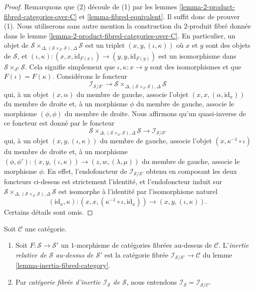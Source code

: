 \begin{proof}
Remarquons que (2) découle de (1) par les
lemmes \ref{lemma-2-product-fibred-categories-over-C} et
\ref{lemma-fibred-equivalent}. Il suffit donc de prouver (1).
Nous utiliserons sans autre mention la construction du $2$-produit fibré
donnée dans le
lemme \ref{lemma-2-product-fibred-categories-over-C}.
En particulier, un objet de
$\mathcal{S}
\times_{\Delta, (\mathcal{S} \times_{\mathcal{S}'} \mathcal{S}), \Delta}
\mathcal{S}$
est un triplet $(x, y, (\iota, \kappa))$ où $x$ et $y$ sont des objets de
$\mathcal{S}$, et
$(\iota, \kappa) : (x, x, \text{id}_{F(x)}) \to (y, y, \text{id}_{F(y)})$
est un isomorphisme dans $\mathcal{S} \times_{\mathcal{S}'} \mathcal{S}$.
Cela signifie simplement que $\iota, \kappa : x \to y$ sont des isomorphismes et que
$F(\iota) = F(\kappa)$. Considérons le foncteur
$$
\mathcal{I}_{\mathcal{S}/\mathcal{S}'}
\longrightarrow
\mathcal{S}
\times_{\Delta, (\mathcal{S} \times_{\mathcal{S}'} \mathcal{S}), \Delta}
\mathcal{S}
$$
qui, à un objet $(x, \alpha)$ du membre de gauche, associe l'objet
$(x, x, (\alpha, \text{id}_x))$ du membre de droite
et, à un morphisme $\phi$ du membre de gauche,
associe le morphisme $(\phi, \phi)$ du membre de droite.
Nous affirmons qu'un quasi-inverse de ce foncteur est donné par le
foncteur
$$
\mathcal{S}
\times_{\Delta, (\mathcal{S} \times_{\mathcal{S}'} \mathcal{S}), \Delta}
\mathcal{S}
\longrightarrow
\mathcal{I}_{\mathcal{S}/\mathcal{S}'}
$$
qui, à un objet $(x, y, (\iota, \kappa))$ du membre de gauche,
associe l'objet $(x, \kappa^{-1} \circ \iota)$ du membre de droite
et, à un morphisme
$(\phi, \phi') : (x, y, (\iota, \kappa)) \to (z, w, (\lambda, \mu))$
du membre de gauche, associe le morphisme $\phi$.
En effet, l'endofoncteur de $\mathcal{I}_{\mathcal{S}/\mathcal{S}'}$ obtenu
en composant les deux foncteurs ci-dessus est strictement l'identité, et
l'endofoncteur induit sur
$\mathcal{S}
\times_{\Delta, (\mathcal{S} \times_{\mathcal{S}'} \mathcal{S}), \Delta}
\mathcal{S}$
est isomorphe à
l'identité par l'isomorphisme naturel
$$
(\text{id}_x, \kappa) :
(x, x, (\kappa^{-1} \circ \iota, \text{id}_x))
\longrightarrow
(x, y, (\iota, \kappa)).
$$
Certains détails sont omis.
\end{proof}

\begin{definition}
\label{definition-inertia-fibred-category}
Soit $\mathcal{C}$ une catégorie.
\begin{enumerate}
\item Soit $F : \mathcal{S} \to \mathcal{S}'$ un $1$-morphisme de
catégories fibrées au-dessus de $\mathcal{C}$. L'{\it inertie relative
de $\mathcal{S}$ au-dessus de $\mathcal{S}'$} est la catégorie fibrée
$\mathcal{I}_{\mathcal{S}/\mathcal{S}'} \to \mathcal{C}$ du
lemme \ref{lemma-inertia-fibred-category}.
\item Par {\it catégorie fibrée d'inertie $\mathcal{I}_\mathcal{S}$
de $\mathcal{S}$}, nous entendons
$\mathcal{I}_\mathcal{S} = \mathcal{I}_{\mathcal{S}/\mathcal{C}}$.
\end{enumerate}
\end{definition}


